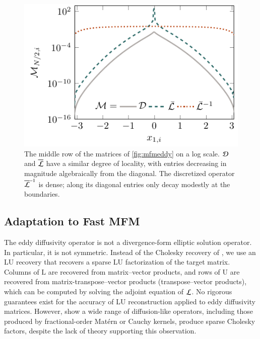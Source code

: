 \documentclass[11pt,sort&compress]{elsarticle}
\begin{document}
\begin{figure}
    \centering
    \includegraphics{figures/slices.pdf}
    \caption{
        The middle row of the matrices of \cref{fig:mfmeddy} on a log scale.
        $\mathcal{D}$ and $\overline{\mathcal{L}}$ have a similar degree of locality, with entries decreasing in magnitude algebraically from the diagonal.
        The discretized operator $\overline{\mathcal{L}}^{-1}$ is dense; along its diagonal entries only decay modestly at the boundaries.
    } 
    \label{fig:slices}
\end{figure}


\subsection{Adaptation to Fast MFM} 

The eddy diffusivity operator is not a divergence-form elliptic solution operator. 
In particular, it is not symmetric. 
Instead of the Cholesky recovery of \citet{schaferSparseRecoveryElliptic2021}, we use an LU recovery that recovers a sparse LU factorization of the target matrix. 
Columns of $\mathrm{L}$ are recovered from matrix--vector products, and rows of $\mathrm{U}$ are recovered from matrix-transpose--vector products (transpose--vector products), which can be computed by solving the adjoint equation of $\mathcal{L}$.
No rigorous guarantees exist for the accuracy of LU reconstruction applied to eddy diffusivity matrices.
However, \citet{schafer2017compression} show a wide range of diffusion-like operators, including those produced by fractional-order Mat{\'e}rn or Cauchy kernels, produce sparse Cholesky factors, despite the lack of theory supporting this observation.
\end{document}

